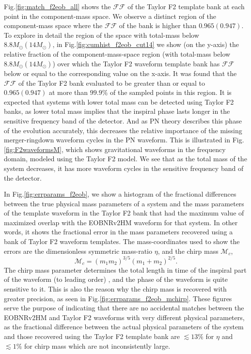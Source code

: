 \documentclass[aps,
prd,
amsmath,
amssymb,
twocolumn,
floatfix,
groupedaddress]{revtex4-1}
\newcommand{\FF}{\mathcal{FF}}
\begin{document}
Fig.\ref{fig:match_f2eob_all} shows the $\mathcal{FF}$ of the Taylor F2 template bank at each point in the component-mass space. We observe a distinct region of the component-mass space where the $\mathcal{FF}$ of the bank is higher than $0.965 (0.947)$. To explore in detail the region of the space with total-mass below $8.8M_{\odot} (14M_{\odot})$, in Fig.\ref{fig:cumhist_f2eob_cut14} we show (on the y-axis) the relative fraction of the component-mass-space region (with total-mass below $8.8M_{\odot} (14M_{\odot})$) over which the Taylor F2 waveform template bank has $\mathcal{FF}$ below or equal to the corresponding value on the x-axis. It was found that the $\FF$ of the Taylor F2 bank evaluated to be greater than or equal to $0.965 (0.947)$ at more than $99.9\%$ of the sampled points in this region. It is expected that systems with lower total mass can be detected using Taylor F2 banks, as lower total mass implies that the inspiral phase lasts longer in the sensitive frequency band of the detector. And as PN theory describes this phase of the evolution accurately, this decreases the relative importance of the missing merger-ringdown waveform cycles in the PN waveform. This is illustrated in Fig.\ref{fig:F2waveformsM}, which shows gravitational waveforms in the frequency domain, modeled using the Taylor F2 model. We see that as the total mass of the system decreases, it has more waveform cycles in the sensitive frequency band of the detector. 

In Fig.\ref{fig:errparams_f2eob}, we show a histogram of the fractional differences between the true physical mass parameters of a system and the mass parameters of the template waveform in the Taylor F2 bank that had the maximum value of maximized overlap with the EOBNRv2HM waveform for that system. In other words, it shows the fractional error in the mass parameters recovered using a bank of Taylor F2 waveform templates. The mass-coordinates used to show the errors are the dimensionless symmetric mass-ratio $\eta$, and the chirp mass $\mathcal{M}_c$,
\begin{equation}
\label{eq:Mchirpdef}
\mathcal{M}_c = (m_1m_2)^{3/5}(m_1+m_2)^{2/5}.
\end{equation}
The chirp mass parameter determines the total length in time of the inspiral part of the waveform (to leading order) \citep{SathyaBankPlacementTauN}, and the phase of the waveform is quite sensitive to it. This is also the reason why the chirp mass is recovered with greater precision, as seen in Fig.\ref{fig:errparams_f2eob_mchirp}. These figures serve the purpose of indicating that there are no accidental matches between the EOBNRv2HM and Taylor F2 waveforms with very different physical parameters, as the fractional difference between the actual physical parameters of the system and those recovered using the Taylor F2 template bank are $\lesssim 13\%$ for $\eta$ and $\lesssim 1\%$ for chirp mass which are not inconsistently large.
\end{document}
